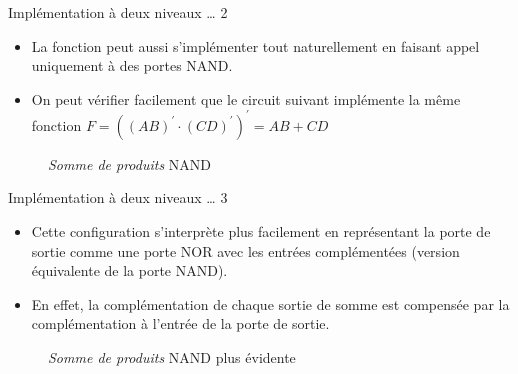 \documentclass[presentation]{beamer}
\begin{document}
\begin{frame}[label={sec:org08777f9}]{Implémentation à deux niveaux \ldots{} 2}
\begin{itemize}
\item La fonction peut aussi s'implémenter tout naturellement en faisant appel uniquement à des portes NAND.

\item On peut vérifier facilement que le circuit suivant implémente la même fonction \(F = ((AB)^\prime \cdot (CD)^\prime)^\prime = AB + CD\)
\end{itemize}

\begin{figure}[htbp]
\centering

\caption{\label{fig:orgdcc340d}\emph{Somme de produits} NAND}
\end{figure} 
\end{frame}

\begin{frame}[label={sec:orge5ffb88}]{Implémentation à deux niveaux \ldots{} 3}
\begin{itemize}
\item Cette configuration s'interprète plus facilement en représentant la porte de sortie comme une porte NOR avec les entrées complémentées (version équivalente de la porte NAND).

\item En effet, la complémentation de chaque sortie de somme est compensée par la complémentation à l'entrée de la porte de sortie.
\end{itemize}

\begin{figure}[htbp]
\centering

\caption{\label{fig:org498c81e}\emph{Somme de produits} NAND plus évidente}
\end{figure}
\end{frame}
\end{document}
